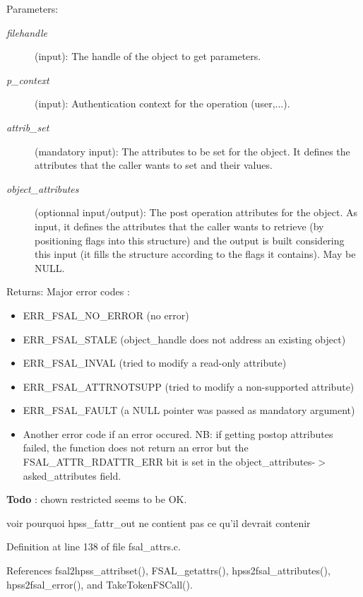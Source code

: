 \begin{Desc}
\item[Parameters:]
\begin{description}
\item[{\em filehandle}](input): The handle of the object to get parameters. \item[{\em p\_\-context}](input): Authentication context for the operation (user,...). \item[{\em attrib\_\-set}](mandatory input): The attributes to be set for the object. It defines the attributes that the caller wants to set and their values. \item[{\em object\_\-attributes}](optionnal input/output): The post operation attributes for the object. As input, it defines the attributes that the caller wants to retrieve (by positioning flags into this structure) and the output is built considering this input (it fills the structure according to the flags it contains). May be NULL.\end{description}
\end{Desc}
\begin{Desc}
\item[Returns:]Major error codes :\begin{itemize}
\item ERR\_\-FSAL\_\-NO\_\-ERROR (no error)\item ERR\_\-FSAL\_\-STALE (object\_\-handle does not address an existing object)\item ERR\_\-FSAL\_\-INVAL (tried to modify a read-only attribute)\item ERR\_\-FSAL\_\-ATTRNOTSUPP (tried to modify a non-supported attribute)\item ERR\_\-FSAL\_\-FAULT (a NULL pointer was passed as mandatory argument)\item Another error code if an error occured. NB: if getting postop attributes failed, the function does not return an error but the FSAL\_\-ATTR\_\-RDATTR\_\-ERR bit is set in the object\_\-attributes-$>$asked\_\-attributes field.\end{itemize}
\end{Desc}


\begin{Desc}
\item[{\bf Todo}]: chown restricted seems to be OK. 

voir pourquoi hpss\_\-fattr\_\-out ne contient pas ce qu'il devrait contenir\end{Desc}


Definition at line 138 of file fsal\_\-attrs.c.

References fsal2hpss\_\-attribset(), FSAL\_\-getattrs(), hpss2fsal\_\-attributes(), hpss2fsal\_\-error(), and Take\-Token\-FSCall().